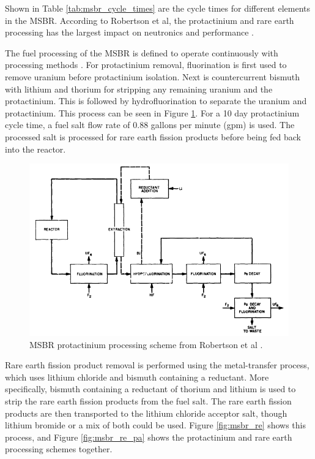 
Shown in Table \ref{tab:msbr_cycle_times} are the cycle times for different elements in the MSBR. According to Robertson et al, the protactinium and rare earth processing has the largest impact on neutronics and performance \cite{robertson_conceptual_1971}. 

The fuel processing of the MSBR is defined to operate continuously with processing methods \cite{robertson_conceptual_1971}. For protactinium removal, fluorination is first used to remove uranium before protactinium isolation. Next is countercurrent bismuth with lithium and thorium for stripping any remaining uranium and the protactinium. This is followed by hydrofluorination to separate the uranium and protactinium. This process can be seen in Figure \ref{fig:msbr_pa}. For a 10 day protactinium cycle time, a fuel salt flow rate of 0.88 gallons per minute (gpm) is used. The processed salt is processed for rare earth fission products before being fed back into the reactor. 
\begin{figure}[H]
  \centering
  \includegraphics[scale=0.55]{images/msbr_pa_robertson.PNG}
  \caption{MSBR protactinium processing scheme from Robertson et al \cite{robertson_conceptual_1971}.}
   \label{fig:msbr_pa}
\end{figure}

Rare earth fission product removal is performed using the metal-transfer process, which uses lithium chloride and bismuth containing a reductant. More specifically, bismuth containing a reductant of thorium and lithium is used to strip the rare earth fission products from the fuel salt. The rare earth fission products are then transported to the lithium chloride acceptor salt, though lithium bromide or a mix of both could be used. Figure \ref{fig:msbr_re} shows this process, and Figure \ref{fig:msbr_re_pa} shows the protactinium and rare earth processing schemes together.

